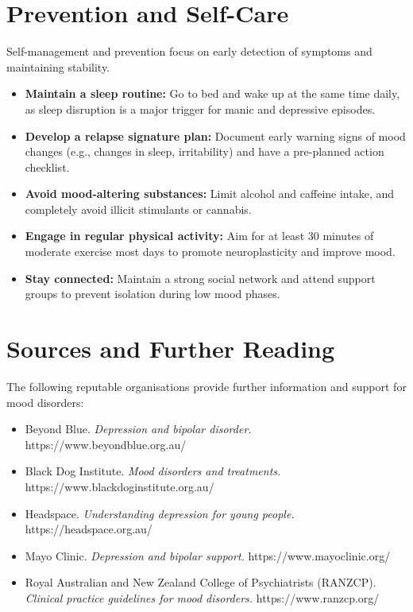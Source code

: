 \section*{Prevention and Self-Care}
Self-management and prevention focus on early detection of symptoms and maintaining stability.
\begin{itemize}
    \item \textbf{Maintain a sleep routine:} Go to bed and wake up at the same time daily, as sleep disruption is a major trigger for manic and depressive episodes.
    \item \textbf{Develop a relapse signature plan:} Document early warning signs of mood changes (e.g., changes in sleep, irritability) and have a pre-planned action checklist.
    \item \textbf{Avoid mood-altering substances:} Limit alcohol and caffeine intake, and completely avoid illicit stimulants or cannabis.
    \item \textbf{Engage in regular physical activity:} Aim for at least 30 minutes of moderate exercise most days to promote neuroplasticity and improve mood.
    \item \textbf{Stay connected:} Maintain a strong social network and attend support groups to prevent isolation during low mood phases.
\end{itemize}

\section*{Sources and Further Reading}
The following reputable organisations provide further information and support for mood disorders:
\begin{itemize}
    \item Beyond Blue. \textit{Depression and bipolar disorder.} https://www.beyondblue.org.au/
    \item Black Dog Institute. \textit{Mood disorders and treatments.} https://www.blackdoginstitute.org.au/
    \item Headspace. \textit{Understanding depression for young people.} https://headspace.org.au/
    \item Mayo Clinic. \textit{Depression and bipolar support.} https://www.mayoclinic.org/
    \item Royal Australian and New Zealand College of Psychiatrists (RANZCP). \textit{Clinical practice guidelines for mood disorders.} https://www.ranzcp.org/
\end{itemize}

